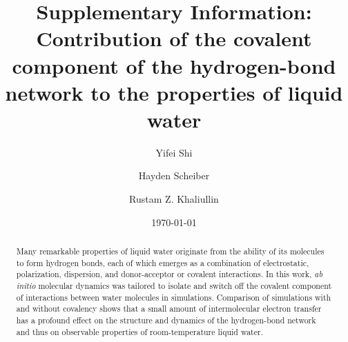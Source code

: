 \documentclass[aps,prl,reprint,amsmath,amssymb]{revtex4-1}
\begin{document}
\newcommand{\Ang}{\ensuremath{\mathring{\text{A}}}}
\newcommand{\ltwid}{\mathrel{\raise.3ex\hbox{$<$\kern-.75em\lower1ex\hbox{$\sim$}}}}
\newcommand{\gtwid}{\mathrel{\raise.3ex\hbox{$>$\kern-.75em\lower1ex\hbox{$\sim$}}}}
\newcommand{\bra}{\langle}
\newcommand{\ket}{\rangle}
\newcommand{\sill}{\psi}
\newcommand{\trace}{{\rm Tr}}
\newcommand{\ntilde}{\tilde{n}}
\newcommand{\stilde}{\tilde{s}}
\newcommand{\atilde}{\tilde{\alpha}}
\newcommand{\new}{\color{red}}
\newcommand{\blue}{\color{blue}}
\newcommand{\old}{\color{black}}
\newcommand{\bea}{\begin{eqnarray}}
\newcommand{\eea}{\end{eqnarray}}
\def\nn{\nonumber\\}




\title{
\ifdefined\MAINTEXT
\else
Supplementary Information: \\
\fi
Contribution of the covalent component of the hydrogen-bond network to the properties of liquid water
}

\author{Yifei Shi}
\author{Hayden Scheiber}
\author{Rustam Z. Khaliullin}

\date{\today}

\ifdefined\MAINTEXT

\begin{abstract}
Many remarkable properties of liquid water originate from the ability of its molecules to form hydrogen bonds, each of which emerges as a combination of electrostatic, polarization, dispersion, and donor-acceptor or covalent interactions.
In this work, \emph{ab initio} molecular dynamics was tailored to isolate and switch off the covalent component of interactions between water molecules in simulations. 
Comparison of simulations with and without covalency shows that a small amount of intermolecular electron transfer has a profound effect on the structure and dynamics of the hydrogen-bond network and thus on observable properties of room-temperature liquid water. 
\end{abstract}
\end{document}
